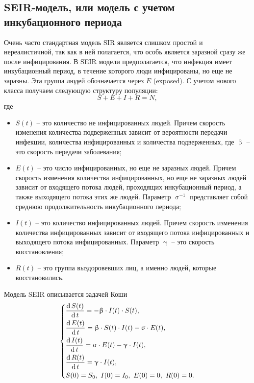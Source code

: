 \documentclass[a4paper, 14pt]{extreport}
\renewcommand{\beta}{\upbeta}
\renewcommand{\gamma}{\upgamma}
\renewcommand{\sigma}{\upsigma}
\renewcommand{\d}{\operatorname{d}}
\begin{document}
	\subsection{SEIR-модель, или модель с учетом инкубационного периода}
 	Очень часто стандартная модель SIR является слишком простой и
	нереалистичной, так как в ней полагается, что особь является заразной сразу же после инфицирования. В SEIR модели предполагается, что инфекция имеет инкубационный период, в течение которого люди инфицированы, но
	еще не заразны. Эта группа людей обозначается через $E$ (exposed). С учетом нового класса получаем следующую структуру
	популяции:
	$$S + E + I + R = N,$$ где
	\begin{itemize}
		\item $S(t)$ -- это количество не инфицированных людей. Причем скорость изменения количества подверженных зависит от вероятности передачи инфекции, количества инфицированных и количества подверженных, где $\beta$ -- это скорость передачи заболевания;
		\item $E(t)$ -- это число инфицированных, но еще не заразных людей. Причем скорость изменения количества инфицированных, но еще не заразных людей зависит от входящего потока людей, проходящих инкубационный период, а также выходящего потока этих же людей. Параметр $\sigma^{-1}$ представляет собой среднюю продолжительность инкубационного периода;
		\item $I(t)$ -- это количество инфицированных людей. Причем	скорость изменения количества инфицированных зависит от входящего потока инфицированных и выходящего потока инфицированных. Параметр $\gamma$ -- это скорость восстановления;
		\item $R(t)$ -- это группа выздоровевших лиц, а именно людей, которые восстановились.
	\end{itemize}
	Модель SEIR описывается задачей Коши
	\begin{equation}
		\begin{dcases}
		\dfrac {\d S(t)}{\d t} = - \beta \cdot I(t)\cdot S(t),\\
		\dfrac {\d E(t)}{\d t} = \beta \cdot S(t)\cdot I(t) - \sigma\cdot E(t),\\
		\dfrac{\d I(t)}{\d t} =\sigma \cdot E(t) - \gamma\cdot I(t),\\
		\dfrac{\d R(t)}{\d t} = \gamma\cdot I(t),\\
		S(0) = S_0,\ I(0) = I_0,\ E(0) = 0,\ R(0) = 0.
		\end{dcases}
	\end{equation}
	
\end{document}

